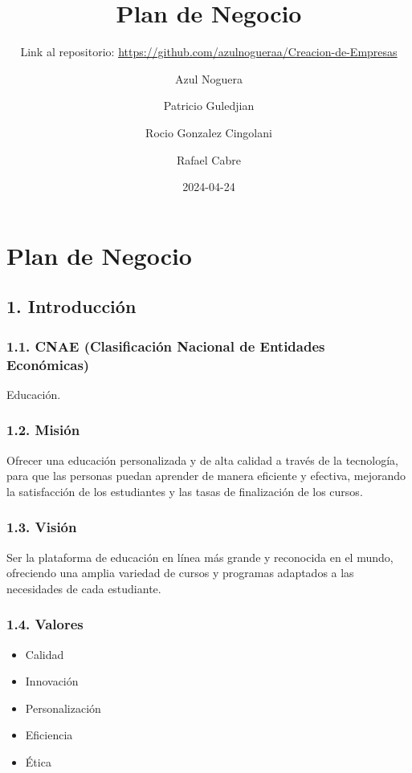 \documentclass[
]{article}
\title{Plan de Negocio}
\subtitle{Link al repositorio:
\url{https://github.com/azulnogueraa/Creacion-de-Empresas}}
\author{Azul Noguera \and Patricio Guledjian \and Rocio Gonzalez
Cingolani \and Rafael Cabre}
\date{2024-04-24}
\providecommand{\tightlist}{%
  \setlength{\itemsep}{0pt}\setlength{\parskip}{0pt}}
\begin{document}
\maketitle

{
\setcounter{tocdepth}{3}
\tableofcontents
}
\newpage

\section*{Plan de Negocio}

\subsection{1. Introducción}\label{introducciuxf3n}

\subsubsection{1.1. CNAE (Clasificación Nacional de Entidades
Económicas)}\label{cnae-clasificaciuxf3n-nacional-de-entidades-econuxf3micas}

Educación.

\subsubsection{1.2. Misión}\label{misiuxf3n}

Ofrecer una educación personalizada y de alta calidad a través de la
tecnología, para que las personas puedan aprender de manera eficiente y
efectiva, mejorando la satisfacción de los estudiantes y las tasas de
finalización de los cursos.

\subsubsection{1.3. Visión}\label{visiuxf3n}

Ser la plataforma de educación en línea más grande y reconocida en el
mundo, ofreciendo una amplia variedad de cursos y programas adaptados a
las necesidades de cada estudiante.

\subsubsection{1.4. Valores}\label{valores}

\begin{itemize}
\tightlist
\item
  Calidad
\item
  Innovación
\item
  Personalización
\item
  Eficiencia
\item
  Ética
\end{itemize}
\end{document}
